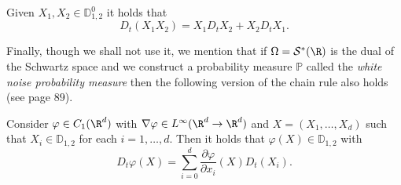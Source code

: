 \documentclass[
    a4paper,
    DIV=14,
    abstract=true,
    numbers=noenddot
]{scrartcl}
\begin{document}
\begin{proposition}
	Given $X_1,X_2\in \mathbb{D}^0_{1,2}$ it holds that
	\begin{equation*}
		D_t(X_1X_2)=X_1D_tX_2+X_2D_tX_1.
	\end{equation*}

\end{proposition}
Finally, though we shall not use it, we mention that if $\Omega=\mathcal{S}^*(\R)$ is the dual of the Schwartz space and we construct a probability measure $\mathbb{P}$ called the \emph{white noise probability measure}  then the following version of the chain rule also holds (see \cite{nunno2008malliavin} page $89$).
\begin{proposition}
	Consider $\varphi\in C_1(\R^d)$ with $\nabla \varphi\in {L^\infty(\R^d\to\R^d)}$ and $X=(X_1,\ldots,X_d)$ such that $X_i\in \mathbb{D}_{1,2}$ for each $i=1,\ldots,d$. Then it holds that $\varphi(X)\in \mathbb{D}_{1,2}$ with
	\begin{equation*}
		D_t\varphi(X)=\sum_{i=0}^{d} \frac{\partial \varphi}{\partial x_i}(X)D_t(X_i) .
	\end{equation*}

\end{proposition}
\end{document}
